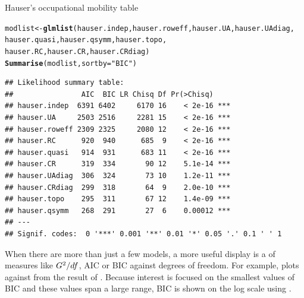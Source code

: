 \documentclass[11pt]{book}\usepackage[]{graphicx}\usepackage[]{color}
\makeatletter
\newcommand{\hlstr}[1]{\textcolor[rgb]{0.192,0.494,0.8}{#1}}%
\newcommand{\hlstd}[1]{\textcolor[rgb]{0.345,0.345,0.345}{#1}}%
\newcommand{\hlkwb}[1]{\textcolor[rgb]{0.69,0.353,0.396}{#1}}%
\newcommand{\hlkwc}[1]{\textcolor[rgb]{0.333,0.667,0.333}{#1}}%
\newcommand{\hlkwd}[1]{\textcolor[rgb]{0.737,0.353,0.396}{\textbf{#1}}}%
\newenvironment{kframe}{%
 \def\at@end@of@kframe{}%
 \ifinner\ifhmode%
  \def\at@end@of@kframe{\end{minipage}}%
  \begin{minipage}{\columnwidth}%
 \fi\fi%
 \def\FrameCommand##1{\hskip\@totalleftmargin \hskip-\fboxsep
 \colorbox{shadecolor}{##1}\hskip-\fboxsep
     \hskip-\linewidth \hskip-\@totalleftmargin \hskip\columnwidth}%
 \MakeFramed {\advance\hsize-\width
   \@totalleftmargin\z@ \linewidth\hsize
   \@setminipage}}%
 {\par\unskip\endMakeFramed%
 \at@end@of@kframe}
\newenvironment{knitrout}{}{} %
\renewenvironment{knitrout}{\small\renewcommand{\baselinestretch}{.85}}{} %
\makeatother
\begin{document}
\begin{Example}[hauser2]{Hauser's occupational mobility table}
\begin{knitrout}
\color{fgcolor}\begin{kframe}
\begin{alltt}
\hlstd{modlist} \hlkwb{<-} \hlkwd{glmlist}\hlstd{(hauser.indep, hauser.roweff, hauser.UA, hauser.UAdiag,}
                   \hlstd{hauser.quasi, hauser.qsymm,  hauser.topo,}
                   \hlstd{hauser.RC, hauser.CR, hauser.CRdiag)}
\hlkwd{Summarise}\hlstd{(modlist,} \hlkwc{sortby}\hlstd{=}\hlstr{"BIC"}\hlstd{)}
\end{alltt}
\begin{verbatim}
## Likelihood summary table:
##                AIC  BIC LR Chisq Df Pr(>Chisq)    
## hauser.indep  6391 6402     6170 16    < 2e-16 ***
## hauser.UA     2503 2516     2281 15    < 2e-16 ***
## hauser.roweff 2309 2325     2080 12    < 2e-16 ***
## hauser.RC      920  940      685  9    < 2e-16 ***
## hauser.quasi   914  931      683 11    < 2e-16 ***
## hauser.CR      319  334       90 12    5.1e-14 ***
## hauser.UAdiag  306  324       73 10    1.2e-11 ***
## hauser.CRdiag  299  318       64  9    2.0e-10 ***
## hauser.topo    295  311       67 12    1.4e-09 ***
## hauser.qsymm   268  291       27  6    0.00012 ***
## ---
## Signif. codes:  0 '***' 0.001 '**' 0.01 '*' 0.05 '.' 0.1 ' ' 1
\end{verbatim}
\end{kframe}
\end{knitrout}

When there are more than just a few models,
a more useful display is a 
of measures like $G^2/df$, AIC or BIC against
degrees of freedom.  For example, 
plots  against  from the result of .
Because interest is focused on the smallest values of BIC
and these values span a large range,
BIC is shown on the log scale using .


\end{Example}
\end{document}
